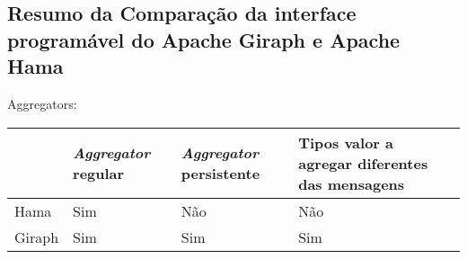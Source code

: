 \subsection{Resumo da Comparação da interface programável do Apache Giraph e 
Apache Hama}

Aggregators:
\begin{table}[H]
 \begin{tabular}{|| l | l | l | l |}\hline
  & \textit{Aggregator} regular & \textit{Aggregator} persistente & Tipos valor a agregar diferentes das mensagens\\\hline
  Hama & Sim & Não & Não \\\hline
  Giraph & Sim & Sim & Sim \\\hline
 \end{tabular}

 
 
\end{table}
